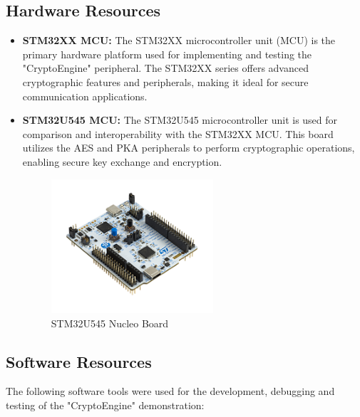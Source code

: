 \subsection{Hardware Resources}
\begin{itemize}
    \item \textbf{STM32XX MCU:} The STM32XX microcontroller unit (MCU) is the primary hardware platform used for implementing and testing the "CryptoEngine" peripheral. The STM32XX series offers advanced cryptographic features and peripherals, making it ideal for secure communication applications.
    \item \textbf{STM32U545 MCU:} The STM32U545 microcontroller unit is used for comparison and interoperability with the STM32XX MCU. This board utilizes the AES and PKA peripherals to perform cryptographic operations, enabling secure key exchange and encryption.
    \begin{figure}[H]
  \centering
  \includegraphics[width=6cm]{img/U5 Nucleo.jpg}
  \caption{STM32U545 Nucleo Board}
  \label{fig:stm32u545n}
\end{figure}
\end{itemize}

\subsection{Software Resources}
The following software tools were used for the  development, debugging and testing of the "CryptoEngine" demonstration:


